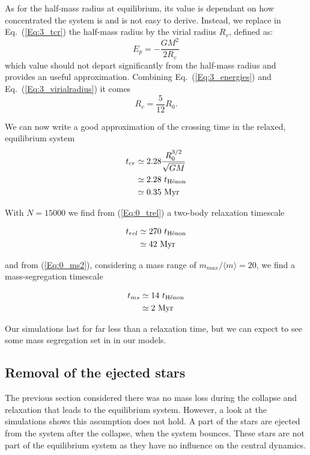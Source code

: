 As for the half-mass radius at equilibrium, its value is dependant on how concentrated the system is and is not easy to derive. Instead, we replace in Eq.~(\ref{Eq:3_tcr}) the half-mass radius by the virial radius $R_v$, defined as:
\begin{equation}
\label{Eq:3_virialradius}
E_p = - \frac{G M^2}{2 R_v}
\end{equation}
which value should not depart significantly from the half-mass radius and provides an useful approximation. Combining Eq.~(\ref{Eq:3_energies}) and Eq.~(\ref{Eq:3_virialradius}) it comes
\begin{equation}
R_v = \frac{5}{12} R_0.
\end{equation}


We can now write a good approximation of the crossing time in the relaxed, equilibrium system
\begin{align}
t_{cr}  &\simeq 2.28 \frac{R_0^{3/2}}{\sqrt{GM}}\\
        &\simeq 2.28~ t_{\textrm{H\'enon}}\\
	    &\simeq 0.35~ {\textrm{Myr}}
\end{align}

 With $N = 15 000$  we find from (\ref{Eq:0_trel}) a two-body relaxation timescale

\begin{align}
t_{rel}  &\simeq 270~ t_{\textrm{H\'enon}}\\
	     &\simeq 42~ {\textrm{Myr}}
\end{align}

and from (\ref{Eq:0_ms2}), considering a mass range of $m_{max}/\langle m\rangle = 20$, we find a mass-segregation timescale

\begin{align}
t_{ms}  &\simeq 14~ t_{\textrm{H\'enon}}\\
	    &\simeq 2~ {\textrm{Myr}}
\end{align}

Our simulations last for far less than a relaxation time, but we can expect to see some mass segregation set in in our models.


\subsection{Removal of the ejected stars}

The previous section considered there was no mass loss during the collapse and relaxation that leads to the equilibrium system. However, a look at the simulations shows this assumption does not hold. A part of the stars are ejected from the system after the collapse, when the system bounces. These stars are not part of the equilibrium system as they have no influence on the central dynamics.

